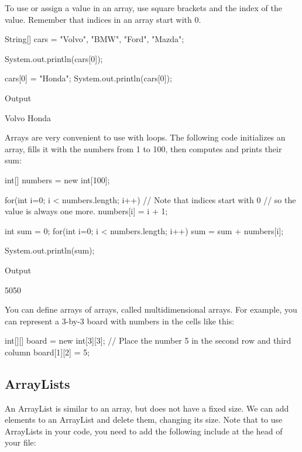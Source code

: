 To use or assign a value in an array, use square brackets and the index of the value. Remember that indices in an array start with 0.

\begin{code}

String[] cars = {"Volvo", "BMW", "Ford", "Mazda"};

System.out.println(cars[0]);

cars[0] = "Honda";
System.out.println(cars[0]);

\end{code}

Output
\begin{code}
Volvo
Honda
\end{code}

Arrays are very convenient to use with loops. The following code initializes an array, fills it with the numbers from 1 to 100, then computes and prints their sum:

\begin{code}

int[] numbers = new int[100];

for(int i=0; i < numbers.length; i++){
    // Note that indices start with 0
    // so the value is always one more. 
    numbers[i] = i + 1;
}

int sum = 0;
for(int i=0; i < numbers.length; i++){
    sum = sum + numbers[i];
}

System.out.println(sum);

\end{code}

Output
\begin{code}
5050
\end{code}

You can define arrays of arrays, called multidimensional arrays. For example, you can represent a 3-by-3 board with numbers in the cells like this:

\begin{code}

int[][] board = new int[3][3];
// Place the number 5 in the second row and third column
board[1][2] = 5; 

\end{code}

\subsection{ArrayLists}

An ArrayList is similar to an array, but does not have a fixed size. We can add elements to an ArrayList and delete them, changing its size. Note that to use ArrayLists in your code, you need to add the following include at the head of your file:

